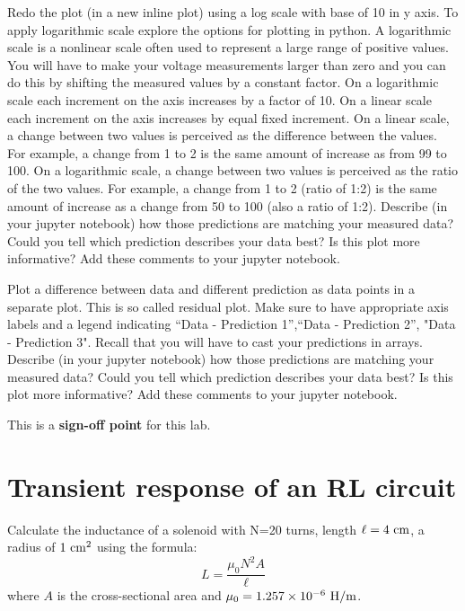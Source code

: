 \begin{plot} Redo the plot (in a new inline plot) using a log scale with base of 10 in y axis. To apply logarithmic scale explore the options for plotting in python. A logarithmic scale is a nonlinear scale often used to represent a large range of positive values. You will have to make your voltage measurements larger than zero and you can do this by shifting the measured values by a constant factor. On a logarithmic scale each increment on the axis increases by a factor of 10. On a linear scale each increment on the axis increases by equal fixed increment.  
On a linear scale, a change between two values is perceived as the difference between the values. For example, a change from 1 to 2 is the same amount of increase as from 99 to 100. On a logarithmic scale, a change between two values is perceived as the ratio of the two values. For example, a change from 1 to 2 (ratio of 1:2) is the same amount of increase as a change from 50 to 100 (also a ratio of 1:2). Describe (in your jupyter notebook) how those predictions are matching your measured data? Could you tell which prediction describes your data best? Is this plot more informative? Add these comments to your jupyter notebook. 
\end{plot}

\begin{plot} Plot a difference between data and different prediction as data points in a separate plot. This is so called residual plot. Make sure to have appropriate axis labels and a legend indicating ``Data - Prediction 1'',``Data - Prediction 2'', "Data - Prediction 3".  Recall that you will have to cast your predictions in arrays. Describe (in your jupyter notebook)  how those predictions are matching your measured data? Could you tell which prediction describes your data best? Is this plot more informative? Add these comments to your jupyter notebook. 
\end{plot}



\noindent
This is a \textbf{sign-off point} for this lab. 

\section{Transient response of an RL circuit}


\begin{measurement}
Calculate the inductance of a solenoid with N=20 turns, length $\ell=4~\rm cm$, a radius of $1~\rm cm^2$ using the formula:
\begin{displaymath}
L = \frac{\mu_0 N^2 A}{\ell}
\end{displaymath}
where $A$ is the cross-sectional area and $\mu_0 = 1.257 \times 10^{-6}~\rm H/m$.
\end{measurement}

